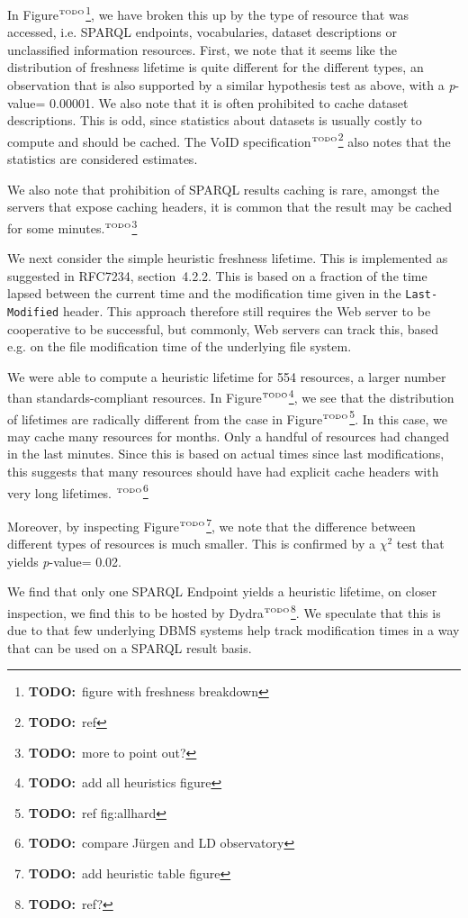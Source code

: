 \documentclass{article}
\newcommand{\pvalue}{\textit{p}-value}
\newcommand{\httph}[1]{\texttt{#1}}
\newcommand{\todo}[1]{\ensuremath{^{\textrm{\tiny{TODO}\normalsize}}}\footnote{\textbf{TODO:}~#1}}
\begin{document}
In Figure\todo{figure with freshness breakdown}, we have broken this
up by the type of resource that was accessed, i.e. SPARQL endpoints,
vocabularies, dataset descriptions or unclassified information
resources. First, we note that it seems like the distribution of
freshness lifetime is quite different for the different types, an
observation that is also supported by a similar hypothesis test as
above, with a \pvalue = 0.00001. We also note that it is often
prohibited to cache dataset descriptions. This is odd, since
statistics about datasets is usually costly to compute and should be
cached. The VoID specification\todo{ref} also notes that the
statistics are considered estimates.

We also note that prohibition of SPARQL results caching is rare,
amongst the servers that expose caching headers, it is common
that the result may be cached for some minutes.\todo{more to point out?}

We next consider the simple heuristic freshness lifetime. This is
implemented as suggested in RFC7234, section~4.2.2. This is based on a
fraction of the time lapsed between the current time and the
modification time given in the \httph{Last-Modified} header. This
approach therefore still requires the Web server to be cooperative to
be successful, but commonly, Web servers can track this, based e.g. on
the file modification time of the underlying file system.

We were able to compute a heuristic lifetime for 554 resources, a
larger number than standards-compliant resources. In Figure\todo{add all
  heuristics figure}, we see that the distribution of lifetimes are
radically different from the case in Figure\todo{ref fig:allhard}. In
this case, we may cache many resources for months. Only a handful of
resources had changed in the last minutes. Since this is based
on actual times since last modifications, this suggests that many
resources should have had explicit cache headers with very long
lifetimes. \todo{compare Jürgen and LD observatory}

Moreover, by inspecting Figure\todo{add heuristic table figure}, we
note that the difference between different types of resources is much
smaller. This is confirmed by a $\chi^2$ test that yields \pvalue =
0.02.

We find that only one SPARQL Endpoint yields a heuristic lifetime, on
closer inspection, we find this to be hosted by Dydra\todo{ref?}. We
speculate that this is due to that few underlying DBMS systems help
track modification times in a way that can be used on a SPARQL result
basis.
\end{document}
